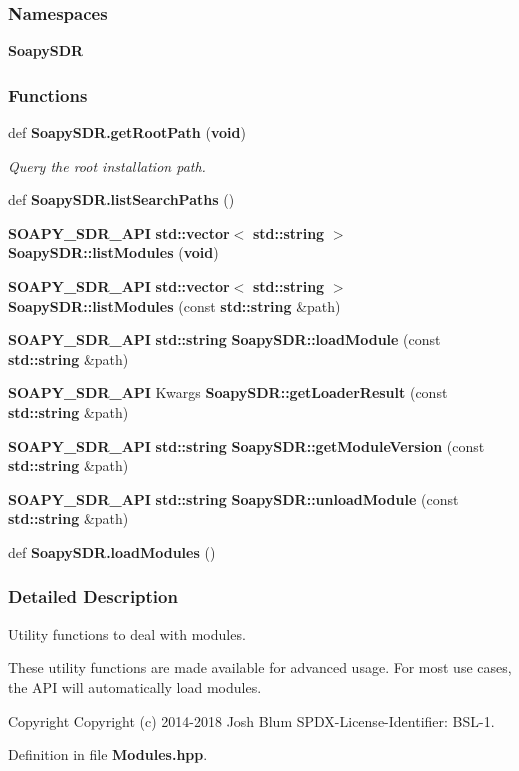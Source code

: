 \subsubsection*{Namespaces}
\begin{DoxyCompactItemize}
\item 
 {\bf Soapy\+S\+DR}
\end{DoxyCompactItemize}
\subsubsection*{Functions}
\begin{DoxyCompactItemize}
\item 
def {\bf Soapy\+S\+D\+R.\+get\+Root\+Path} ({\bf void})
\begin{DoxyCompactList}\small\item\em Query the root installation path. \end{DoxyCompactList}\item 
def {\bf Soapy\+S\+D\+R.\+list\+Search\+Paths} ()
\item 
{\bf S\+O\+A\+P\+Y\+\_\+\+S\+D\+R\+\_\+\+A\+PI} {\bf std\+::vector}$<$ {\bf std\+::string} $>$ {\bf Soapy\+S\+D\+R\+::list\+Modules} ({\bf void})
\item 
{\bf S\+O\+A\+P\+Y\+\_\+\+S\+D\+R\+\_\+\+A\+PI} {\bf std\+::vector}$<$ {\bf std\+::string} $>$ {\bf Soapy\+S\+D\+R\+::list\+Modules} (const {\bf std\+::string} \&path)
\item 
{\bf S\+O\+A\+P\+Y\+\_\+\+S\+D\+R\+\_\+\+A\+PI} {\bf std\+::string} {\bf Soapy\+S\+D\+R\+::load\+Module} (const {\bf std\+::string} \&path)
\item 
{\bf S\+O\+A\+P\+Y\+\_\+\+S\+D\+R\+\_\+\+A\+PI} Kwargs {\bf Soapy\+S\+D\+R\+::get\+Loader\+Result} (const {\bf std\+::string} \&path)
\item 
{\bf S\+O\+A\+P\+Y\+\_\+\+S\+D\+R\+\_\+\+A\+PI} {\bf std\+::string} {\bf Soapy\+S\+D\+R\+::get\+Module\+Version} (const {\bf std\+::string} \&path)
\item 
{\bf S\+O\+A\+P\+Y\+\_\+\+S\+D\+R\+\_\+\+A\+PI} {\bf std\+::string} {\bf Soapy\+S\+D\+R\+::unload\+Module} (const {\bf std\+::string} \&path)
\item 
def {\bf Soapy\+S\+D\+R.\+load\+Modules} ()
\end{DoxyCompactItemize}


\subsubsection{Detailed Description}
Utility functions to deal with modules. 

These utility functions are made available for advanced usage. For most use cases, the A\+PI will automatically load modules.

\begin{DoxyCopyright}{Copyright}
Copyright (c) 2014-\/2018 Josh Blum S\+P\+D\+X-\/\+License-\/\+Identifier\+: B\+S\+L-\/1. 
\end{DoxyCopyright}


Definition in file {\bf Modules.\+hpp}.

